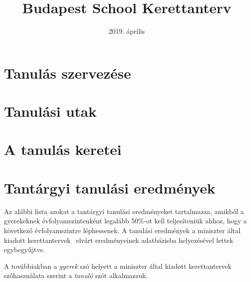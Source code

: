 \documentclass[magyar,12pt,a4paper,oneside]{report}
\begin{document}
\newif\ifkerettanterv
\kerettantervtrue

\title{Budapest School Kerettanterv}
\author{}
\date{2019. \'aprilis}
\maketitle
%

\pagestyle{headings}
\setcounter{page}{1}

\tableofcontents
\newpage
\setcounter{page}{1}

\pagestyle{plain}



\chapter{Tanulás szervezése}


\chapter{Tanulási utak}


\chapter{A tanulás keretei}



\chapter{Tantárgyi tanulási eredmények}
\label{sec:tantargyi_tanulasi_eredmenyek}
Az alábbi lista azokat a tantárgyi tanulási eredményeket tartalmazza, amikből a
gyerekeknek évfolyamszintenként legalább 50\%-ot kell teljesíteniük ahhoz, hogy
a következő évfolyamszintre léphessenek.
A tanulási eredmények a miniszter
által kiadott kerettantervek\ \cite{ofi:kerettanterv}  elvárt eredményeinek
adatbázisba
helyezésével lettek egybegyűjtve.

A továbbiakban a \emph{gyerek} szó helyett a miniszter által kiadott
kerettantervek szóhasználata szerint a \emph{tanuló} szót alkalmazzuk.


{}
\label{sec:bibliographyk}

\end{document}
